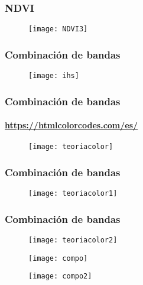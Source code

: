 \documentclass[14pt]{beamer}
\begin{document}
\begin{frame}
\frametitle{NDVI}
  \begin{figure}
    \centering
    \texttt{[image: NDVI3]}
  \end{figure}
\tiny{}
\end{frame}
\begin{frame}
\frametitle{Combinación de bandas}
  \begin{figure}
    \centering
    \texttt{[image: ihs]}
  \end{figure}
\tiny{}
\end{frame}
\begin{frame}
\frametitle{Combinación de bandas}
\framesubtitle{\url{https://htmlcolorcodes.com/es/}}
  \begin{figure}
    \centering
    \texttt{[image: teoriacolor]}
  \end{figure}
\tiny{}
\end{frame}
\begin{frame}
\frametitle{Combinación de bandas}
  \begin{figure}
    \centering
    \texttt{[image: teoriacolor1]}
  \end{figure}
\tiny{}
\end{frame}
\begin{frame}
\frametitle{Combinación de bandas}
  \begin{figure}
    \centering
    \texttt{[image: teoriacolor2]}
  \end{figure}
\tiny{}
\end{frame}
\begin{frame}
  \begin{figure}
    \centering
    \texttt{[image: compo]}
  \end{figure}
\tiny{}
\end{frame}
\begin{frame}
  \begin{figure}
    \centering
    \texttt{[image: compo2]}
  \end{figure}
\tiny{}
\end{frame}
\end{document}
